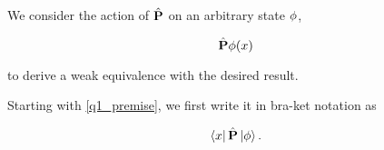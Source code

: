 We consider the action of $\hat{\textbf{P}}$ on an arbitrary
state $\phi$, 

\begin{equation}
    \hat{\textbf{P}} \phi(x) 
    \label{q1_premise}
\end{equation}

to derive a weak equivalence with the desired result.

Starting with \cref{q1_premise}, we first write it in
bra-ket notation as

\begin{equation}
    \bra{x} \hat{\textbf{P}} \ket{\phi}.
\end{equation}

